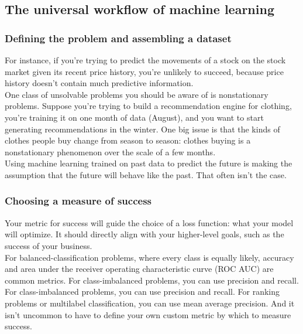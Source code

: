 \documentclass{article}
\numberwithin{equation}{section} %
\begin{document}
\subsection{The universal workflow of machine learning}

\subsubsection{Defining the problem and assembling a dataset}

For instance, if you’re trying to predict the movements of a stock on the stock market given its recent price history, you’re unlikely to succeed, because price history doesn’t contain much predictive information. \\

One class of unsolvable problems you should be aware of is nonstationary problems.
Suppose you’re trying to build a recommendation engine for clothing, you’re training
it on one month of data (August), and you want to start generating recommendations
in the winter. One big issue is that the kinds of clothes people buy change from season to season: clothes buying is a nonstationary phenomenon over the scale of a few months. \\

Using machine learning trained on past data to predict the future is making the
assumption that the future will behave like the past. That often isn’t the case. 

\subsubsection{Choosing a measure of success}

Your metric for success will guide the choice of a loss function: what your model
will optimize. It should directly align with your higher-level goals, such as the success of your business. \\

For balanced-classification problems, where every class is equally likely, accuracy and area under the receiver operating characteristic curve (ROC AUC) are common metrics. For class-imbalanced problems, you can use precision and recall. \\

For
class-imbalanced problems, you can use precision and recall. For ranking problems or
multilabel classification, you can use mean average precision. And it isn’t uncommon
to have to define your own custom metric by which to measure success. \\
\end{document}
